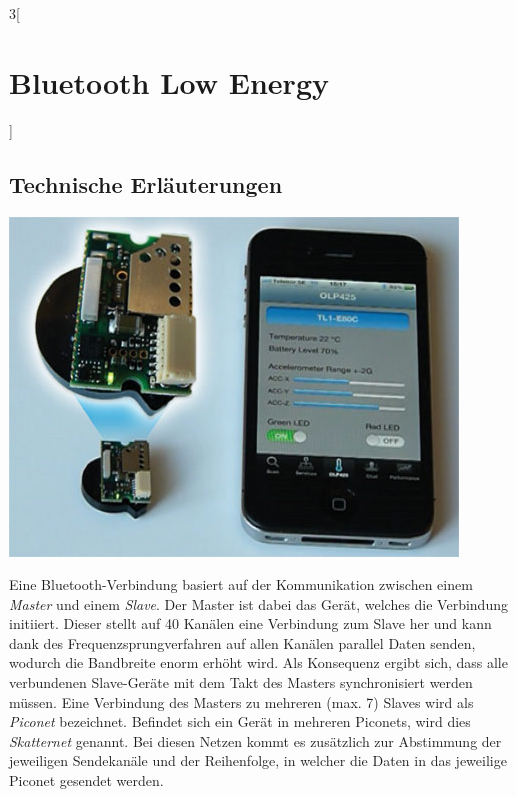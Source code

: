 \begin{multicols}{3}[\section{Bluetooth Low Energy}]
\subsection*{Technische Erläuterungen}
\begin{Figure}
\includegraphics[width=\linewidth]{Kapitel/BLE/Grafiken/BLE_mod.jpg}
\label{fig:BLE-Mod}
\end{Figure}
Eine Bluetooth-Verbindung basiert auf der Kommunikation zwischen einem \textit{Master} und einem \textit{Slave}. Der Master ist dabei das Gerät, welches die Verbindung initiiert. Dieser stellt auf 40 Kanälen eine Verbindung zum Slave her und kann dank des Frequenzsprungverfahren auf allen Kanälen parallel Daten senden, wodurch die Bandbreite enorm erhöht wird. Als Konsequenz ergibt sich, dass alle verbundenen Slave-Geräte mit dem Takt des Masters synchronisiert werden müssen.
Eine Verbindung des Masters zu mehreren (max. 7) Slaves wird als \textit{Piconet} bezeichnet. Befindet sich ein Gerät in mehreren Piconets, wird dies \textit{Skatternet} genannt. Bei diesen Netzen kommt es zusätzlich zur Abstimmung der jeweiligen Sendekanäle und der Reihenfolge, in welcher die Daten in das jeweilige Piconet gesendet werden.


\end{multicols}
